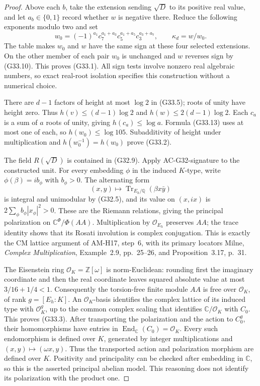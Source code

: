 \begin{proof}
Above each $b$, take the extension sending $\sqrt D$ to
its positive real value, and let $a_b\in\{0,1\}$ record
whether $w$ is negative there.  Reduce the following
exponents modulo two and set
\[
 w_0=(-1)^{a_1}c_7^{a_1+a_3}c_5^{a_1+a_5}c_3^{a_3+a_7},
                  \qquad \kappa_d=w/w_0.             \tag{G33.13}
\]
The table makes $w_0$ and $w$ have the same sign at
these four selected extensions.  On the other member of
each pair $w_0$ is unchanged and $w$ reverses sign by
(G33.10).  This proves (G33.1).
All sign tests involve nonzero real algebraic numbers,
so exact real-root isolation specifies this construction
without a numerical choice.

There are $d-1$ factors of height at most $\log2$ in
(G33.5); roots of unity have height zero.  Thus
$h(v)\leq(d-1)\log2$ and
$h(w)\leq2(d-1)\log2$.
Each $c_a$ is a sum of $a$ roots of unity, giving
$h(c_a)\leq\log a$.  Formula (G33.13) uses at most one
of each, so $h(w_0)\leq\log105$.
Subadditivity of height under multiplication and
$h(w_0^{-1})=h(w_0)$ prove (G33.2).

The field $R(\sqrt D)$ is contained in (G32.9).
Apply AC-G32-signature to the constructed unit.
For every embedding $\phi$ in the induced $K$-type,
write $\phi(\beta)=ib_\phi$ with $b_\phi>0$.
The alternating form
\[
                     (x,y)\longmapsto
                  \operatorname{Tr}_{E_h/\mathbb Q}(\beta x\bar y)
\]
is integral and unimodular by (G32.5), and its value on
$(x,ix)$ is $2\sum_\phi b_\phi|x_\phi|^2>0$.
These are the Riemann relations, giving the principal
polarization on $\mathbb C^{\Phi}/\Phi(AA)$.
Multiplication by $\mathcal O_{E_h}$ preserves $AA$;
the trace identity shows that its Rosati involution is
complex conjugation.  This is exactly the CM lattice
argument of AM-H17, step~6, with its primary locators
Milne, \emph{Complex Multiplication}, Example~2.9,
pp.~25--26, and Proposition~3.17, p.~31.

The Eisenstein ring $\mathcal O_K=\mathbb Z[\omega]$
is norm-Euclidean: rounding first the imaginary coordinate
and then the real coordinate leaves squared absolute value
at most $3/16+1/4<1$.  Consequently the torsion-free
finite module $AA$ is free over $\mathcal O_K$, of rank
$g=[E_h:K]$.
An $\mathcal O_K$-basis identifies the complex lattice of
its induced type with $\mathcal O_K^g$, up to the common
complex scaling that identifies $\mathbb C/\mathcal O_K$
with $C_0$.  This proves (G33.3).
After transporting the polarization and the action to
$C_0^g$, their homomorphisms have entries in
$\operatorname{End}_{\mathbb C}(C_0)=\mathcal O_K$.
Every such endomorphism is defined over $K$, generated by
integer multiplications and $(x,y)\mapsto(\omega x,y)$.
Thus the transported action and polarization morphism are
defined over $K$.  Positivity and principality can be checked
after embedding in $\mathbb C$, so this is the asserted
principal abelian model.  This reasoning does not identify
its polarization with the product one.


\end{proof}
